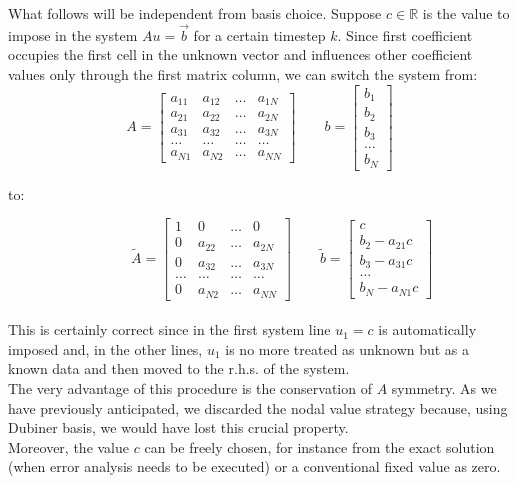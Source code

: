 \documentclass[a4paper,11pt]{article}
\begin{document}
\noindent What follows will be independent from basis choice. Suppose $c\in \mathbb{R}$ is the value to impose in the system $Au=\vec{b}$ for a certain timestep $k$. Since first coefficient occupies the first cell in the unknown vector and influences other coefficient values only through the first matrix column, we can switch the system from: \\

\begin{equation*}
A=\begin{bmatrix}
a_{11} & a_{12} & \dots & a_{1N} \\ 
a_{21} & a_{22} & \dots & a_{2N} \\ 
a_{31} &a_{32} & \dots & a_{3N} \\
\dots & \dots & \dots & \dots \\
a_{N1}  & a_{N2} & \dots & a_{NN}
\end{bmatrix} \quad \quad
b=\begin{bmatrix}
b_1 \\ b_2 \\ b_3 \\ \dots \\ b_N
\end{bmatrix}
\end{equation*}

to:

\begin{equation*}
\quad \quad  \quad \, \tilde{A}=\begin{bmatrix}
1 & 0 & \dots & 0 \\ 
0 & a_{22} & \dots & a_{2N} \\ 
0 &a_{32} & \dots & a_{3N} \\
\dots & \dots & \dots & \dots \\
0  & a_{N2} & \dots & a_{NN}
\end{bmatrix} \quad \quad
\tilde{b}=\begin{bmatrix}
c \\ b_2 -a_{21}c \\ b_3-a_{31}c \\ \dots \\ b_N-a_{N1}c
\end{bmatrix}
\end{equation*}
\vspace{4mm} \\
\noindent This is certainly correct since in the first system line $u_1=c$ is automatically imposed and, in the other lines, $u_1$ is no more treated as unknown but as a known data and then moved to the r.h.s. of the system. \\
The very advantage of this procedure is the conservation of $A$ symmetry. As we have previously anticipated, we discarded the nodal value strategy because, using Dubiner basis, we would have lost this crucial property. \\
Moreover, the value $c$ can be freely chosen, for instance from the exact solution (when error analysis needs to be executed) or a conventional fixed value as zero. \\ 
\end{document}

